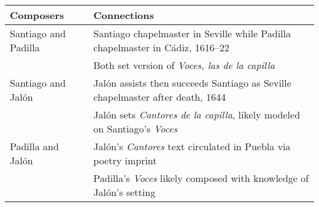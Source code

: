 \begingroup
\footnotesize
\newcommand{\tabitem}{\textbullet\enspace}
\noindent\begin{tabulary}{\textwidth}{lL}
    \toprule
    Composers & Connections\\ \midrule

    Santiago and Padilla
    & \tabitem Santiago chapelmaster in Seville while Padilla chapelmaster in Cádiz,
    1616--22 \\
    & \tabitem Both set version of \emph{Voces, las de la capilla} \\ \addlinespace
    
    Santiago and Jalón
    & \tabitem Jalón assists then succeeds Santiago as Seville chapelmaster after death,
    1644 \\
    & \tabitem Jalón sets \emph{Cantores de la capilla}, likely modeled on Santiago's
    \emph{Voces} \\ \addlinespace

    Padilla and Jalón 
    & \tabitem Jalón's \emph{Cantores} text circulated in Puebla via poetry imprint \\
    & \tabitem Padilla's \emph{Voces} likely composed with knowledge of Jalón's setting \\
    \bottomrule
\end{tabulary}
\endgroup
\endinput



